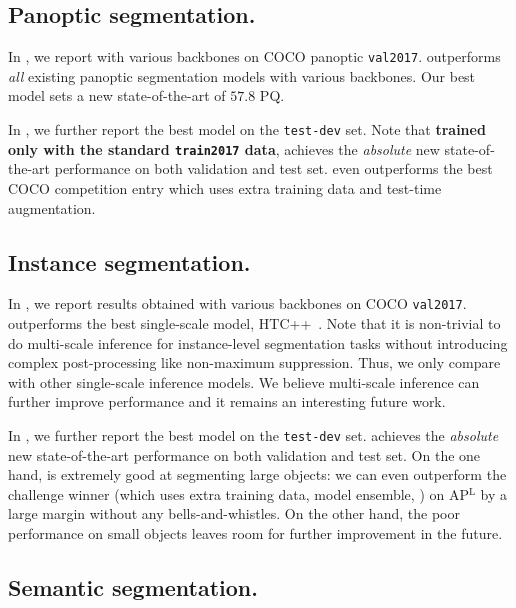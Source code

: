 \subsection{Panoptic segmentation.}
\label{app:results:panoptic}

In , we report \modelname with various backbones on COCO panoptic \texttt{val2017}. \modelname outperforms \emph{all} existing panoptic segmentation models with various backbones. Our best model sets a new state-of-the-art of $57.8$ PQ.

In , we further report the best \modelname model on the \texttt{test-dev} set. Note that \modelname \textbf{trained only with the standard \texttt{train2017} data}, achieves the \emph{absolute} new state-of-the-art performance on both validation and test set. \modelname even outperforms the best COCO competition entry which uses extra training data and test-time augmentation.

\subsection{Instance segmentation.}
\label{app:results:instance}

In , we report \modelname results obtained with various backbones on COCO \texttt{val2017}. \modelname outperforms the best single-scale model, HTC++~\cite{liu2021swin,chen2019hybrid}. Note that it is non-trivial to do multi-scale inference for instance-level segmentation tasks without introducing complex post-processing like non-maximum suppression. Thus, we only compare \modelname with other  single-scale inference models. We believe multi-scale inference can further improve \modelname performance and it remains an interesting future work.

In , we further report the best \modelname model on the \texttt{test-dev} set. \modelname achieves the \emph{absolute} new state-of-the-art performance on both validation and test set. On the one hand, \modelname is extremely good at segmenting large objects: we can even outperform the challenge winner (which uses extra training data, model ensemble, \etc) on AP$^\text{L}$ by a large margin without any bells-and-whistles. On the other hand, the poor performance on small objects leaves room for further improvement in the future.

\subsection{Semantic segmentation.}
\label{app:results:semantic}

